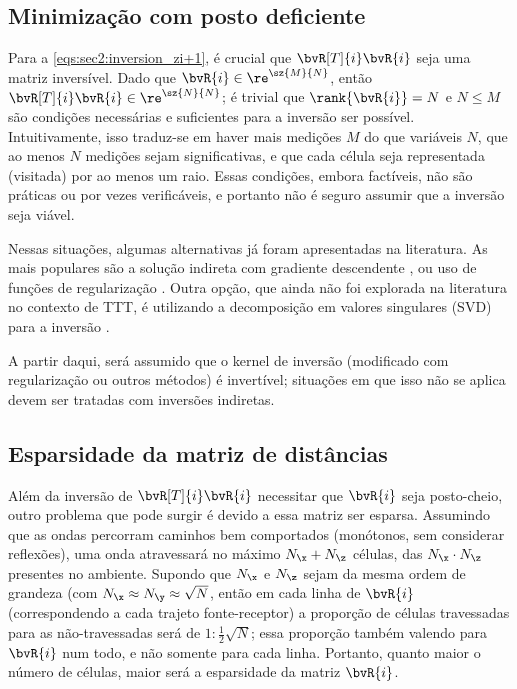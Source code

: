 \subsection{Minimização com posto deficiente}
Para a \cref{eqs:sec2:inversion_zi+1}, é crucial que $\bvR[T]{i}\bvR{i}$ seja uma matriz inversível. Dado que $\bvR{i} \in \re^{\sz{M}{N}}$, então $\bvR[T]{i}\bvR{i} \in \re^{\sz{N}{N}}$; é trivial que $\rank{\bvR{i}} = N$ e $N \leq M$ são condições necessárias e suficientes para a inversão ser possível. Intuitivamente, isso traduz-se em haver mais medições $M$ do que variáveis $N$, que ao menos $N$ medições sejam significativas, e que cada célula seja representada (visitada) por ao menos um raio. Essas condições, embora factíveis, não são práticas ou por vezes verificáveis, e portanto não é seguro assumir que a inversão seja viável.

Nessas situações, algumas alternativas já foram apresentadas na literatura. As mais populares são a solução indireta com gradiente descendente \cite{ali_opensource_2019,hormati_robust_2010,zhang_inversion_2016,tang_travel_2024}, ou uso de funções de regularização \cite{ali_opensource_2019,hormati_robust_2010,tang_travel_2024,zhang_inversion_2016}. Outra opção, que ainda não foi explorada na literatura no contexto de TTT, é utilizando a decomposição em valores singulares (SVD) \cite{barata_moore_2012,golub_calculating_1965} para a inversão \cite{brand_fast_2006,chen_treatment_2006}.

A partir daqui, será assumido que o kernel de inversão (modificado com regularização ou outros métodos) é invertível; situações em que isso não se aplica devem ser tratadas com inversões indiretas.

\subsection{Esparsidade da matriz de distâncias}

Além da inversão de $\bvR[T]{i} \bvR{i}$ necessitar que $\bvR{i}$ seja posto-cheio, outro problema que pode surgir é devido a essa matriz ser esparsa. Assumindo que as ondas percorram caminhos bem comportados (monótonos, sem considerar reflexões), uma onda atravessará no máximo $N_{\x} + N_{\z}$ células, das $N_{\x}\cdot N_{\z}$ presentes no ambiente. Supondo que $N_{\x}$ e $N_{\z}$ sejam da mesma ordem de grandeza (com $N_{\x} \approx N_{\y} \approx \sqrt{N}$, então em cada linha de $\bvR{i}$ (correspondendo a cada trajeto fonte-receptor) a proporção de células travessadas para as não-travessadas será de $1:\frac{1}{2}\sqrt{N}$; essa proporção também valendo para $\bvR{i}$ num todo, e não somente para cada linha. Portanto, quanto maior o número de células, maior será a esparsidade da matriz $\bvR{i}$.

